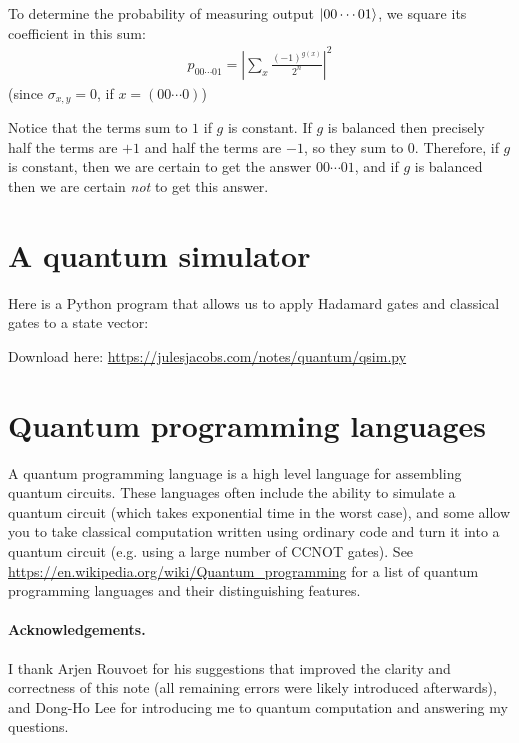 To determine the probability of measuring output $\ket{00\cdots01}$, we square its coefficient in this sum:
\begin{align*}
  p_{00\cdots01} =\left|\sum_x \frac{(-1)^{g(x)}}{2^n}\right|^2
\end{align*}
(since $\sigma_{x,y} = 0$, if $x = (00\cdots0)$)

Notice that the terms sum to $1$ if $g$ is constant. If $g$ is balanced then precisely half the terms are $+1$ and half the terms are $-1$, so they sum to $0$.
Therefore, if $g$ is constant, then we are certain to get the answer $00\cdots01$, and if $g$ is balanced then we are certain \emph{not} to get this answer.

\section{A quantum simulator}

Here is a Python program that allows us to apply Hadamard gates and classical gates to a state vector:


Download here: \url{https://julesjacobs.com/notes/quantum/qsim.py}

\section{Quantum programming languages}

A quantum programming language is a high level language for assembling quantum circuits.
These languages often include the ability to simulate a quantum circuit (which takes exponential time in the worst case),
and some allow you to take classical computation written using ordinary code and turn it into a quantum circuit (e.g. using a large number of CCNOT gates).
See \url{https://en.wikipedia.org/wiki/Quantum_programming} for a list of quantum programming languages and their distinguishing features.

\paragraph{Acknowledgements.}
I thank Arjen Rouvoet for his suggestions that improved the clarity and correctness of this note (all remaining errors were likely introduced afterwards),
and Dong-Ho Lee for introducing me to quantum computation and answering my questions.






